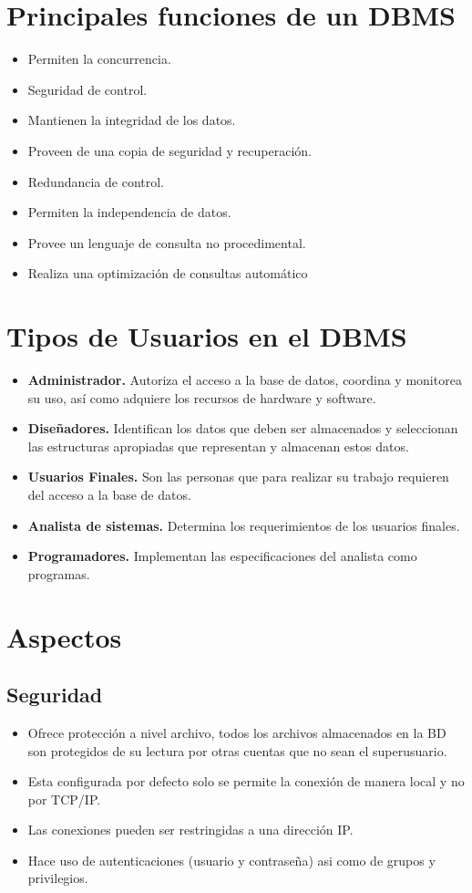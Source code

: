 \documentclass[spanish,12pt,letterpapper]{article}
\begin{document}
	\section{Principales funciones de un DBMS}
	\begin{itemize}
	\item Permiten la concurrencia.
	\item Seguridad de control.
	\item Mantienen la integridad de los datos.
	\item Proveen de una copia de seguridad y recuperación.
	\item Redundancia de control.
	\item Permiten la independencia de datos.
	\item Provee un lenguaje de consulta no procedimental.
	\item Realiza una optimización de consultas automático
	\end{itemize}
	
	\pagebreak
	
	\section{Tipos de Usuarios en el DBMS}
	\begin{itemize}
	\item \textbf{Administrador.} Autoriza el acceso a la base de datos, coordina y monitorea su uso, así como adquiere los recursos de hardware y software.
	\item \textbf{Diseñadores.} Identifican los datos que deben ser almacenados y seleccionan las estructuras apropiadas que representan y almacenan estos datos.
	\item \textbf{Usuarios Finales. }Son las personas que para realizar su trabajo requieren del acceso a la base de datos.
	\item \textbf{Analista de sistemas.} Determina los requerimientos de los usuarios finales. 
	\item \textbf{Programadores.} Implementan las especificaciones del analista como programas.
	\end{itemize}
	
	\section{Aspectos}
	\subsection{Seguridad}	
	\begin{itemize}
	\item Ofrece protección a nivel archivo, todos los archivos almacenados en la BD son protegidos de su lectura por otras cuentas que no sean el superusuario.
	\item Esta configurada por defecto solo se permite la conexión de manera local y no por TCP/IP.
	\item Las conexiones pueden ser restringidas a una dirección IP.
	\item Hace uso de autenticaciones (usuario y contraseña) asi como de grupos y privilegios.
	\end{itemize}
	
\end{document}
